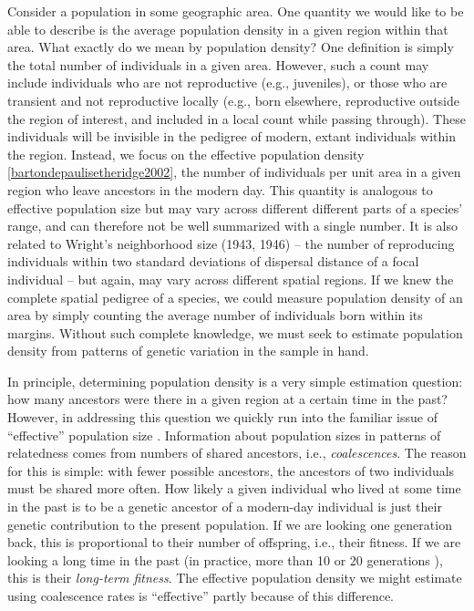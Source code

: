 \documentclass{ar-1col}
\begin{document}
Consider a population in some geographic area. 
One quantity we would like to be able to describe 
is the average population density in a given region within that area.
What exactly do we mean by population density?
One definition is simply the total number of individuals in a given area.
However, such a count may include 
individuals who are not reproductive (e.g., juveniles), 
or those who are transient and not reproductive locally 
(e.g., born elsewhere, reproductive outside the region of interest, 
and included in a local count while passing through).
These individuals will be invisible in the pedigree 
of modern, extant individuals within the region.
Instead, we focus on the effective population density \ref{bartondepaulisetheridge2002}, 
the number of individuals per unit area in a given region 
who leave ancestors in the modern day.
This quantity is analogous to effective population size 
but may vary across different different parts of a species' range, 
and can therefore not be well summarized with a single number.
It is also related to Wright's neighborhood size (1943, 1946) -- 
the number of reproducing individuals within two standard deviations 
of dispersal distance of a focal individual -- 
but again, may vary across different spatial regions.
If we knew the complete spatial pedigree of a species, 
we could measure population density of an area 
by simply counting the average number of individuals born within its margins.
Without such complete knowledge, 
we must seek to estimate population density from patterns of genetic variation 
in the sample in hand.

In principle, determining population density is a very simple estimation question:
how many ancestors were there in a given region at a certain time in the past?
However, in addressing this question we quickly run into the familiar
issue of ``effective'' population size \cite{CharlesworthCharlesworthBarton2003}.
Information about population sizes in patterns of relatedness
comes from numbers of shared ancestors, i.e., \textit{coalescences}.
The reason for this is simple:
with fewer possible ancestors, the ancestors of two individuals
must be shared more often.
How likely a given individual who lived at some time in the past
is to be a genetic ancestor of a modern-day individual
is just their genetic contribution to the present population.
If we are looking one generation back, 
this is proportional to their number of offspring, i.e., their fitness.
If we are looking a long time in the past
(in practice, more than 10 or 20 generations \cite{bartonfitness}),
this is their \textit{long-term fitness}.
The effective population density we might estimate using coalescence rates
is ``effective'' partly because of this difference.
\end{document}
